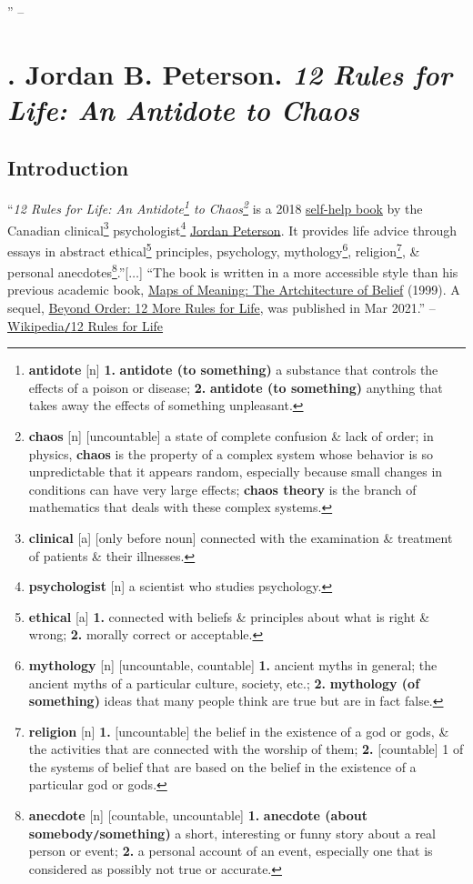 \documentclass[oneside]{book}
\numberwithin{equation}{section}
\begin{document}
'' -- \cite[p. 8--]{Pascal2003}


\chapter{\cite{Peterson2018}. Jordan B. Peterson. \textit{12 Rules for Life: An Antidote to Chaos}}

\section*{Introduction}
``\textit{12 Rules for Life: An Antidote\footnote{\textbf{antidote} [n] \textbf{1.} \textbf{antidote (to something)} a substance that controls the effects of a poison or disease; \textbf{2.} \textbf{antidote (to something)} anything that takes away the effects of something unpleasant.} to Chaos\footnote{\textbf{chaos} [n] [uncountable] a state of complete confusion \& lack of order; in physics, \textbf{chaos} is the property of a complex system whose behavior is so unpredictable that it appears random, especially because small changes in conditions can have very large effects; \textbf{chaos theory} is the branch of mathematics that deals with these complex systems.}} is a 2018 \href{https://en.wikipedia.org/wiki/Self-help_book}{self-help book} by the Canadian clinical\footnote{\textbf{clinical} [a] [only before noun] connected with the examination \& treatment of patients \& their illnesses.} psychologist\footnote{\textbf{psychologist} [n] a scientist who studies psychology.} \href{https://en.wikipedia.org/wiki/Jordan_Peterson}{Jordan Peterson}. It provides life advice through essays in abstract ethical\footnote{\textbf{ethical} [a] \textbf{1.} connected with beliefs \& principles about what is right \& wrong; \textbf{2.} morally correct or acceptable.} principles, psychology, mythology\footnote{\textbf{mythology} [n] [uncountable, countable] \textbf{1.} ancient myths in general; the ancient myths of a particular culture, society, etc.; \textbf{2.} \textbf{mythology (of something)} ideas that many people think are true but are in fact false.}, religion\footnote{\textbf{religion} [n] \textbf{1.} [uncountable] the belief in the existence of a god or gods, \& the activities that are connected with the worship of them; \textbf{2.} [countable] 1 of the systems of belief that are based on the belief in the existence of a particular god or gods.}, \& personal anecdotes\footnote{\textbf{anecdote} [n] [countable, uncountable] \textbf{1.} \textbf{anecdote (about somebody\texttt{/}something)} a short, interesting or funny story about a real person or event; \textbf{2.} a personal account of an event, especially one that is considered as possibly not true or accurate.}.''[$\ldots$] ``The book is written in a more accessible style than his previous academic book, \href{https://en.wikipedia.org/wiki/Maps_of_Meaning:_The_Architecture_of_Belief}{Maps of Meaning: The Artchitecture of Belief} (1999). A sequel, \href{https://en.wikipedia.org/wiki/Beyond_Order}{Beyond Order: 12 More Rules for Life}, was published in Mar 2021.'' -- \href{https://en.wikipedia.org/wiki/12_Rules_for_Life}{Wikipedia\texttt{/}12 Rules for Life}
\end{document}
